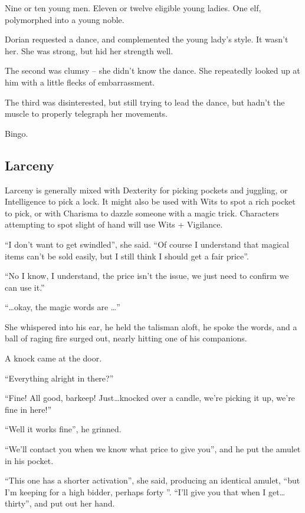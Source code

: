 \begin{multicols}{2}
\begin{exampletext}
  Nine or ten young men.
  Eleven or twelve eligible young ladies.
  One elf, polymorphed into a young noble.

  Dorian requested a dance, and complemented the young lady's style.
  It wasn't her.
  She was strong, but hid her strength well.

  The second was clumsy -- she didn't know the dance.
  She repeatedly looked up at him with a little flecks of embarrassment.

  The third was disinterested, but still trying to lead the dance, but hadn't the muscle to properly telegraph her movements.

  Bingo.
\end{exampletext}

\subsection{Larceny}

Larceny is generally mixed with Dexterity for picking pockets and juggling, or Intelligence to pick a lock.
It might also be used with Wits to spot a rich pocket to pick, or with Charisma to dazzle someone with a magic trick.
Characters attempting to spot slight of hand will use Wits + Vigilance.

\begin{exampletext}
  ``I don't want to get swindled'', she said.
  ``Of course I understand that magical items can't be sold easily, but I still think I should get a fair price''.

  ``No I know, I understand, the price isn't the issue, we just need to confirm we can use it.''

  ``\ldots okay, the magic words are \ldots''

  She whispered into his ear, he held the talisman aloft, he spoke the words, and a ball of raging fire surged out, nearly hitting one of his companions.

  A knock came at the door.

  ``Everything alright in there?''

  ``Fine!
  All good, barkeep!
  Just\ldots knocked over a candle, we're picking it up, we're fine in here!''

  ``Well it works fine'', he grinned.

  ``We'll contact you when we know what price to give you'', and he put the amulet in his pocket.

  ``This one has a shorter activation'', she said, producing an identical amulet, ``but I'm keeping for a high bidder, perhaps forty ''.
  ``I'll give you that when I get\ldots thirty'', and put out her hand.


\end{exampletext}
\end{multicols}
